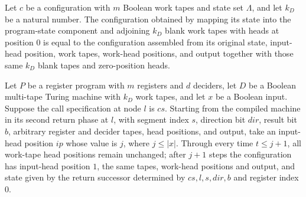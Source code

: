 \begin{lemma}
\label{Complexity.LogProg.seam_eq_mkCfg}
\leanok
{}
Let $c$ be a configuration with $m$ Boolean work tapes and state set $\Lambda$, and let
$k_D$ be a natural number. The configuration obtained by mapping its state into the
program-state component and adjoining $k_D$ blank work tapes with heads at position $0$
is equal to the configuration assembled from its original state, input-head position,
work tapes, work-head positions, and output together with those same $k_D$ blank tapes
and zero-position heads.
\end{lemma}

\begin{lemma}
\label{Complexity.LogProg.ret2_run}
\leanok
{}
Let $P$ be a register program with $m$ registers and $d$ deciders, let $D$ be a Boolean
multi-tape Turing machine with $k_D$ work tapes, and let $x$ be a Boolean input. Suppose
the call specification at node $l$ is $cs$. Starting from the compiled machine in its
second return phase at $l$, with segment index $s$, direction bit $dir$, result bit $b$,
arbitrary register and decider tapes, head positions, and output, take an input-head
position $ip$ whose value is $j$, where $j\le |x|$. Through every time $t\le j+1$, all
work-tape head positions remain unchanged; after $j+1$ steps the configuration has
input-head position $1$, the same tapes, work-head positions and output, and state given
by the return successor determined by $cs,l,s,dir,b$ and register index $0$.
\end{lemma}

